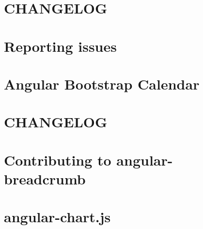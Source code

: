 \documentclass[twoside]{book}
\newcommand{\+}{\discretionary{\mbox{\scriptsize$\hookleftarrow$}}{}{}}
\begin{document}
\chapter{C\+H\+A\+N\+G\+E\+L\+OG}
\label{md_app_web_bower_components_angular-bootstrap-calendar__c_h_a_n_g_e_l_o_g}

\chapter{Reporting issues}
\label{md_app_web_bower_components_angular-bootstrap-calendar__c_o_n_t_r_i_b_u_t_i_n_g}

\chapter{Angular Bootstrap Calendar}
\label{md_app_web_bower_components_angular-bootstrap-calendar__r_e_a_d_m_e}

\chapter{C\+H\+A\+N\+G\+E\+L\+OG}
\label{md_app_web_bower_components_angular-breadcrumb__c_h_a_n_g_e_l_o_g}

\chapter{Contributing to angular-\/breadcrumb}
\label{md_app_web_bower_components_angular-breadcrumb__c_o_n_t_r_i_b_u_t_i_n_g}

\chapter{angular-\/chart.js}
\label{md_app_web_bower_components_angular-chart_8js__r_e_a_d_m_e}

\end{document}
